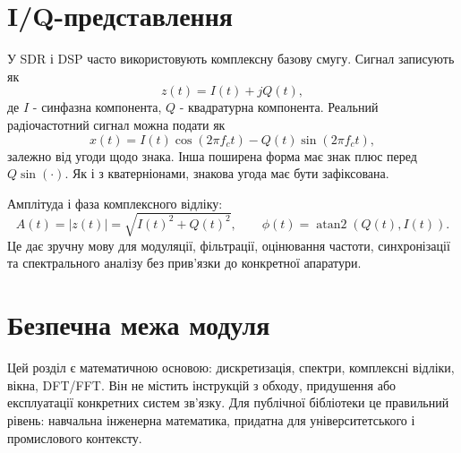 \section{I/Q-представлення}

У SDR і DSP часто використовують комплексну базову смугу. Сигнал записують як
\begin{equation}\label{eq:iq_complex_session02}
z(t)=I(t)+jQ(t),
\end{equation}
де $I$ - синфазна компонента, $Q$ - квадратурна компонента. Реальний радіочастотний сигнал можна подати як
\begin{equation}\label{eq:iq_rf_session02}
x(t)=I(t)\cos(2\pi f_c t)-Q(t)\sin(2\pi f_c t),
\end{equation}
залежно від угоди щодо знака. Інша поширена форма має знак плюс перед $Q\sin(\cdot)$. Як і з кватерніонами, знакова угода має бути зафіксована.

Амплітуда і фаза комплексного відліку:
\begin{equation}
A(t)=|z(t)|=\sqrt{I(t)^2+Q(t)^2},
\qquad
\phi(t)=\operatorname{atan2}(Q(t),I(t)).
\end{equation}
Це дає зручну мову для модуляції, фільтрації, оцінювання частоти, синхронізації та спектрального аналізу без прив'язки до конкретної апаратури.

\section{Безпечна межа модуля}

Цей розділ є математичною основою: дискретизація, спектри, комплексні відліки, вікна, DFT/FFT. Він не містить інструкцій з обходу, придушення або експлуатації конкретних систем зв'язку. Для публічної бібліотеки це правильний рівень: навчальна інженерна математика, придатна для університетського і промислового контексту.
